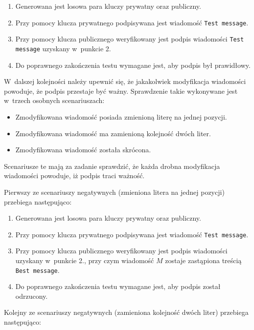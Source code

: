 \documentclass{article}
\begin{document}
        \begin{enumerate}
            \item Generowana jest losowa para kluczy prywatny oraz publiczny.
            \item Przy pomocy klucza prywatnego podpisywana jest wiadomość \verb+Test message+.
            \item Przy pomocy klucza publicznego weryfikowany jest podpis wiadomości \verb+Test message+ uzyskany w~punkcie 2.
            \item Do poprawnego zakończenia testu wymagane jest, aby podpis był prawidłowy.
        \end{enumerate}

        W~dalszej kolejności należy upewnić się, że jakakolwiek modyfikacja wiadomości powoduje, że podpis przestaje być ważny. Sprawdzenie takie wykonywane jest w~trzech osobnych scenariuszach:
        
        \begin{itemize}
            \item Zmodyfikowana wiadomość posiada zmienioną literę na jednej pozycji.
            \item Zmodyfikowana wiadomość ma zamienioną kolejność dwóch liter.
            \item Zmodyfikowana wiadomość została skrócona.
        \end{itemize}
        
\noindent Scenariusze te mają za zadanie sprawdzić, że każda drobna modyfikacja wiadomości powoduje, iż podpis traci ważność.

        Pierwszy ze scenariuszy negatywnych (zmieniona litera na jednej pozycji) przebiega następująco:
        
        \begin{enumerate}
            \item Generowana jest losowa para kluczy prywatny oraz publiczny.
            \item Przy pomocy klucza prywatnego podpisywana jest wiadomość \verb+Test message+.
            \item Przy pomocy klucza publicznego weryfikowany jest podpis wiadomości uzyskany w~punkcie 2., przy czym wiadomość $M$ zostaje zastąpiona treścią \verb+Best message+.
            \item Do poprawnego zakończenia testu wymagane jest, aby podpis został odrzucony.
        \end{enumerate}

        Kolejny ze scenariuszy negatywnych (zamieniona kolejność dwóch liter) przebiega następująco:
        
\end{document}
